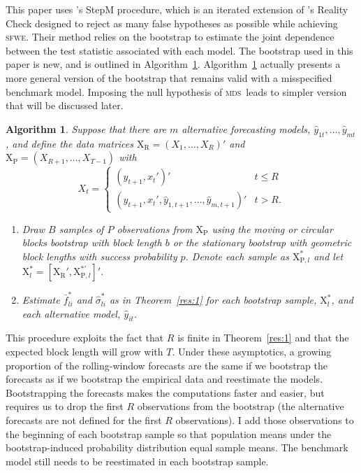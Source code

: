 \documentclass[11pt,fleqn]{article}
\newcommand\citepos[2][]{\citeauthor{#2}'s \citeyearpar[#1]{#2}}
\newtheorem{alg}{Algorithm}
\theoremstyle{definition}
\newcommand{\X}{\ensuremath{\mathrm{X}}}
\newcommand{\R}{\ensuremath{\mathrm{R}}}
\newcommand{\p}{\ensuremath{\mathrm{P}}}
\newcommand{\mds}{\textsc{mds}}
\newcommand{\sfwe}{\textsc{sfwe}}
\begin{document}
This paper uses \citepos{RoW:05} StepM procedure, which is an iterated
extension of \citepos{Whi:00} Reality Check designed to reject as many
false hypotheses as possible while achieving \sfwe.  Their method
relies on the bootstrap to estimate the joint dependence between the
test statistic associated with each model.  The bootstrap used in this
paper is new, and is outlined in Algorithm~\ref{alg:1}.
Algorithm~\ref{alg:1} actually presents a more general version of the
bootstrap that remains valid with a misspecified benchmark model.
Imposing the null hypothesis of \mds\ leads to simpler version that
will be discussed later.
\begin{alg}\label{alg:1}
  Suppose that there are $m$ alternative forecasting models,
  $\hat{y}_{1t},\dots, \hat{y}_{mt}$, and define the data matrices
  $\X_\R = (X_1,\dots,X_R)'$ and $\X_{\p} = (X_{R+1},\dots,X_{T-1})$
  with
  \begin{equation*}
    X_t = \begin{cases}
      (y_{t+1}, x_t')' & t \leq R \\
      (y_{t+1}, x_t', \hat{y}_{1,t+1}, \dots, \hat{y}_{m,t+1})' & t > R.
    \end{cases}
  \end{equation*}
  \begin{enumerate}
  \item Draw $B$ samples of $P$ observations from $\X_{\p}$ using the
    moving or circular blocks bootstrap with block length $b$ or the
    stationary bootstrap with geometric block lengths with success
    probability $p$.  Denote each sample as $\X_{\p, l}^{*}$ and let
    $\X_l^{*} = [\X_{\R}', \X_{\p,l}^{*\prime}]'$.
  \item Estimate $\bar{f}^{*}_{li}$ and $\hat{\sigma}_{li}^{*}$ as in
    Theorem~\ref{res:1} for each bootstrap sample, $\X^{*}_l$, and each
    alternative model, $\hat{y}_{it}$.
  \end{enumerate}
\end{alg}

This procedure exploits the fact that $R$ is finite in
Theorem~\ref{res:1} and that the expected block length will grow with
$T$.  Under these asymptotics, a growing proportion of the
rolling-window forecasts are the same if we bootstrap the forecasts as
if we bootstrap the empirical data and reestimate the models.
Bootstrapping the forecasts makes the computations faster and easier,
but requires us to drop the first $R$ observations from the bootstrap
(the alternative forecasts are not defined for the first $R$
observations).  I add those observations to the beginning of each
bootstrap sample so that population means under the bootstrap-induced
probability distribution equal sample means.  The benchmark model
still needs to be reestimated in each bootstrap sample.
\end{document}
